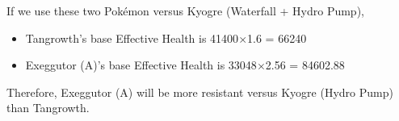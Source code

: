 \documentclass[12pt]{beamer}
\begin{document}
\begin{frame}
\begin{block}{}
\begin{footnotesize}
\begin{itemize}
  If we use these two Pokémon versus Kyogre (Waterfall + Hydro Pump), 
  \begin{itemize}
  \item \footnotesize Tangrowth's base Effective Health is 41400$\times$1.6 = 66240
  \item\footnotesize Exeggutor (A)'s base Effective Health is 33048$\times$2.56 = 84602.88
\end{itemize}
 Therefore, Exeggutor (A) will be more resistant versus Kyogre (Hydro Pump) than Tangrowth.
\end{itemize}

\end{footnotesize}
\end{block}
\end{frame}
\end{document}
